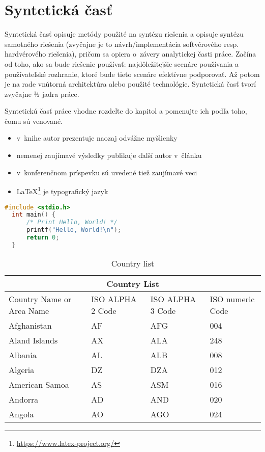 
\chapter{Syntetická časť}
\label{methodology}

Syntetická časť opisuje metódy použité na syntézu riešenia a opisuje syntézu samotného riešenia (zvyčajne je to návrh/implementácia softvérového resp. hardvérového riešenia), pričom sa opiera o~závery analytickej časti práce. Začína od toho, ako sa bude riešenie používať: najdôležitejšie scenáre používania a používateľské rozhranie, ktoré bude tieto scenáre efektívne podporovať. Až potom je na rade vnútorná architektúra alebo použité technológie. Syntetická časť tvorí zvyčajne ½ jadra práce.

Syntetickú časť práce vhodne rozdeľte do kapitol a pomenujte ich podľa toho, čomu sú venované.

\begin{itemize}
  \item v~knihe \cite{book} autor prezentuje naozaj odvážne myšlienky
  \item nemenej zaujímavé výsledky publikuje ďalší autor v~článku \cite{article} 
  \item v~konferenčnom príspevku \cite{conference} sú uvedené tiež zaujímavé veci
  \item \LaTeX{}\footnote{\url{https://www.latex-project.org/}} je typografický jazyk
\end{itemize}



\begin{lstlisting}[language=C,caption={Program, ktorý pozdraví celý svet}]
  #include <stdio.h>
  int main() {
      /* Print Hello, World! */
      printf("Hello, World!\n");
      return 0;
  }
  \end{lstlisting}


  
\begin{table}[!ht]
	\caption{Country list}\label{t:1}
	\smallskip
	\centering

	\begin{tabular}{ |p{3cm}||p{3cm}|p{3cm}|p{3cm}|  }
		\hline
		\multicolumn{4}{|c|}{Country List} \\
		\hline
		Country Name or Area Name& ISO ALPHA 2 Code &ISO ALPHA 3 Code&ISO numeric Code\\
		\hline
		Afghanistan & AF & AFG & 004\\
		Aland Islands & AX & ALA & 248\\
		Albania & AL & ALB & 008\\
		Algeria & DZ & DZA & 012\\
		American Samoa & AS & ASM & 016\\
		Andorra & AD & AND & 020\\
		Angola & AO & AGO & 024\\
		\hline
	\end{tabular}
\end{table}
